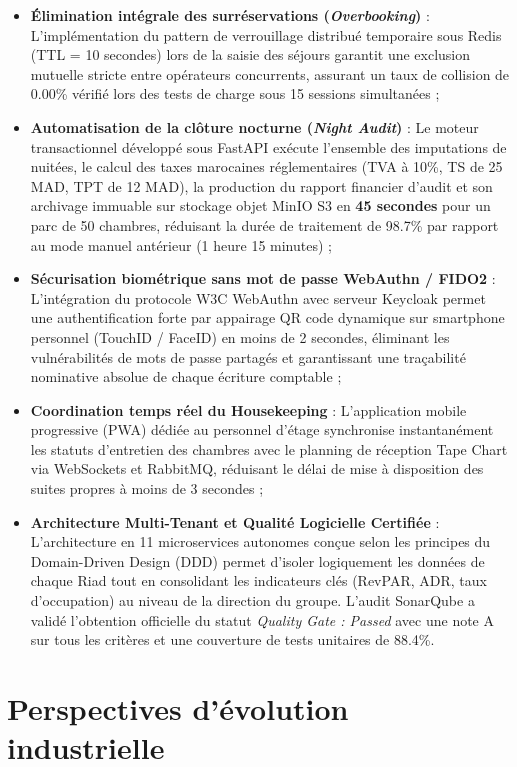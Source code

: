 \documentclass[12pt,a4paper,oneside]{report}
\begin{document}
\begin{itemize}
    \item \textbf{Élimination intégrale des surréservations (\textit{Overbooking})} : L'implémentation du pattern de verrouillage distribué temporaire sous Redis (TTL = 10 secondes) lors de la saisie des séjours garantit une exclusion mutuelle stricte entre opérateurs concurrents, assurant un taux de collision de 0.00\% vérifié lors des tests de charge sous 15 sessions simultanées ;
    \item \textbf{Automatisation de la clôture nocturne (\textit{Night Audit})} : Le moteur transactionnel développé sous FastAPI exécute l'ensemble des imputations de nuitées, le calcul des taxes marocaines réglementaires (TVA à 10\%, TS de 25 MAD, TPT de 12 MAD), la production du rapport financier d'audit et son archivage immuable sur stockage objet MinIO S3 en \textbf{45 secondes} pour un parc de 50 chambres, réduisant la durée de traitement de 98.7\% par rapport au mode manuel antérieur (1 heure 15 minutes) ;
    \item \textbf{Sécurisation biométrique sans mot de passe WebAuthn / FIDO2} : L'intégration du protocole W3C WebAuthn avec serveur Keycloak permet une authentification forte par appairage QR code dynamique sur smartphone personnel (TouchID / FaceID) en moins de 2 secondes, éliminant les vulnérabilités de mots de passe partagés et garantissant une traçabilité nominative absolue de chaque écriture comptable ;
    \item \textbf{Coordination temps réel du Housekeeping} : L'application mobile progressive (PWA) dédiée au personnel d'étage synchronise instantanément les statuts d'entretien des chambres avec le planning de réception Tape Chart via WebSockets et RabbitMQ, réduisant le délai de mise à disposition des suites propres à moins de 3 secondes ;
    \item \textbf{Architecture Multi-Tenant et Qualité Logicielle Certifiée} : L'architecture en 11 microservices autonomes conçue selon les principes du Domain-Driven Design (DDD) permet d'isoler logiquement les données de chaque Riad tout en consolidant les indicateurs clés (RevPAR, ADR, taux d'occupation) au niveau de la direction du groupe. L'audit SonarQube a validé l'obtention officielle du statut \textit{Quality Gate : Passed} avec une note A sur tous les critères et une couverture de tests unitaires de 88.4\%.
\end{itemize}

\section*{Perspectives d'évolution industrielle}
\end{document}
